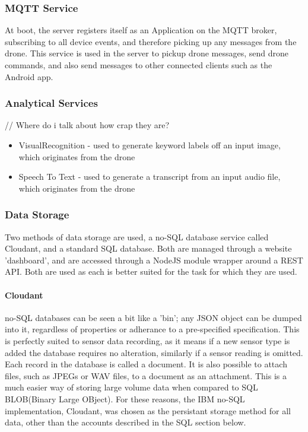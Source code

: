 \documentclass{article}
\begin{document}
\subsubsection{MQTT Service}
At boot, the server registers itself as an Application on the MQTT broker, subscribing to all device events, and therefore picking up any messages from the drone. This service is used in the server to pickup drone messages, send drone commands, and also send messages to other connected clients such as the Android app.

\subsubsection{Analytical Services}\label{AnalyticalServices}
// Where do i talk about how crap they are?
\begin{itemize}
	\item VisualRecognition - used to generate keyword labels off an input image, which originates from the drone 
	\item Speech To Text - used to generate a transcript from an input audio file, which originates from the drone
\end{itemize}

\subsubsection{Data Storage}
Two methods of data storage are used, a no-SQL database service called Cloudant, and a standard SQL database. Both are managed through a website 'dashboard', and are accessed through a NodeJS module wrapper around a REST API. Both are used as each is better suited for the task for which they are used.
\paragraph{Cloudant}
no-SQL databases can be seen a bit like a 'bin'; any JSON object can be dumped into it, regardless of properties or adherance to a pre-specified specification. This is perfectly suited to sensor data recording, as it means if a new sensor type is added the database requires no alteration, similarly if a sensor reading is omitted. Each record in the database is called a document. It is also possible to attach files, such as JPEGs or WAV files, to a document as an attachment. This is a much easier way of storing large volume data when compared to SQL BLOB(Binary Large OBject). For these reasons, the IBM no-SQL implementation, Cloudant, was chosen as the persistant storage method for all data, other than the accounts described in the SQL section below. 
\end{document}
